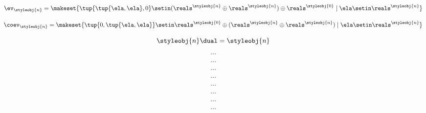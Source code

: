\begin{forslides}
     \begin{equation}
        \label{eq:slides_trace_monoidal_19}
       \ev_\styleobj{n} = \makeset{\tup{\tup{\ela, \ela},0} \setin (\reals^\styleobj{n} \oplus \reals^\styleobj{n}) \oplus \reals^\styleobj{0} \mid \ela \setin \reals^\styleobj{n}}
    \end{equation}
    
     \begin{equation}
        \label{eq:slides_trace_monoidal_20}
       \coev_\styleobj{n} = \makeset{\tup{0, \tup{\ela, \ela}} \setin \reals^\styleobj{0} \oplus (\reals^\styleobj{n} \oplus \reals^\styleobj{n}) \mid \ela \setin \reals^\styleobj{n}}
    \end{equation}
    
     \begin{equation}
        \label{eq:slides_trace_monoidal_21}
       \styleobj{n}\dual = \styleobj{n}
    \end{equation}
    
     \begin{equation}
        \label{eq:slides_trace_monoidal_22}
       ...
    \end{equation}
    
     \begin{equation}
        \label{eq:slides_trace_monoidal_23}
       ...
    \end{equation}
    
     \begin{equation}
        \label{eq:slides_trace_monoidal_24}
       ...
    \end{equation}
    
    \begin{equation}
        \label{eq:slides_trace_monoidal_25}
       ...
    \end{equation}
    
     \begin{equation}
        \label{eq:slides_trace_monoidal_26}
       ...
    \end{equation}
    
     \begin{equation}
        \label{eq:slides_trace_monoidal_27}
       ...
    \end{equation}
    
     \begin{equation}
        \label{eq:slides_trace_monoidal_28}
       ...
    \end{equation}
    
     \begin{equation}
        \label{eq:slides_trace_monoidal_29}
       ...
    \end{equation}
    

\end{forslides}
